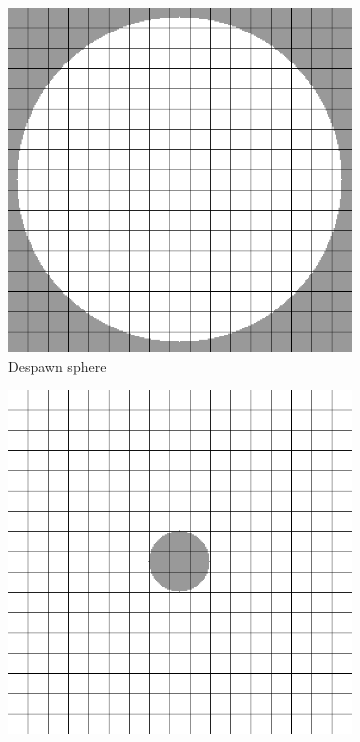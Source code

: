 \documentclass[12pt]{article}
\begin{document}
\begin{figure}[H]
\begin{subfigure}{0.25\textwidth}
\includegraphics[width=.9\linewidth]{despawn-sphere.png}
\caption{Despawn sphere}
\label{fig:despawn-sphere}
\end{subfigure}%
\begin{subfigure}{0.25\textwidth}
\includegraphics[width=.9\linewidth]{exclusion-sphere.png}

\end{subfigure}
\end{figure}
\end{document}
